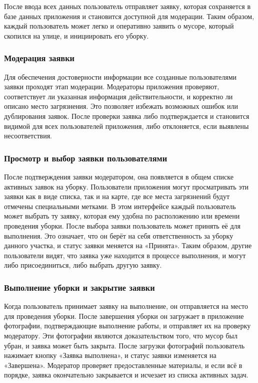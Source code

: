 \documentclass[diploma]{SCWorks}
\begin{document}
После ввода всех данных пользователь отправляет заявку, которая сохраняется 
в базе данных приложения и становится доступной для модерации. Таким образом, 
каждый пользователь может легко и оперативно заявить о мусоре, который 
скопился на улице, и инициировать его уборку. 

\subsubsection{Модерация заявки}

Для обеспечения достоверности информации все созданные пользователями заявки 
проходят этап модерации. Модераторы приложения проверяют, соответствует ли 
указанная информация действительности, и корректно ли описано место 
загрязнения. Это позволяет избежать возможных ошибок или дублирования заявок. 
После проверки заявка либо подтверждается и становится видимой для 
всех пользователей приложения, либо отклоняется, если выявлены несоответствия.

\subsubsection{Просмотр и выбор заявки пользователями}

После подтверждения заявки модератором, она появляется в общем списке активных 
заявок на уборку. Пользователи приложения могут просматривать эти заявки 
как в виде списка, так и на карте, где все места загрязнений будут отмечены 
специальными метками. В этом интерфейсе каждый пользователь может выбрать ту 
заявку, которая ему удобна по расположению или времени проведения уборки. 
После выбора заявки пользователь может принять её для выполнения. Это 
означает, что он берёт на себя ответственность за уборку данного участка, 
и статус заявки меняется на «Принята». Таким образом, другие пользователи 
видят, что заявка уже находится в процессе выполнения, и могут либо 
присоединиться, либо выбрать другую заявку.

\subsubsection{Выполнение уборки и закрытие заявки}

Когда пользователь принимает заявку на выполнение, он отправляется на место 
для проведения уборки. После завершения уборки он загружает в приложение 
фотографии, подтверждающие выполнение работы, и отправляет их на проверку 
модератору. Эти фотографии являются доказательством того, что мусор был 
убран, и заявка может быть закрыта. После загрузки фотографий пользователь 
нажимает кнопку «Заявка выполнена», и статус заявки изменяется на «Завершена».
Модератор проверяет предоставленные материалы, и если всё в порядке, заявка 
окончательно закрывается и исчезает из списка активных задач.
\end{document}
